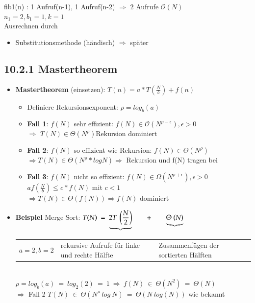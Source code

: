 \documentclass[11pt, fleqn]{scrreprt}
\begin{document}
fib1(n) : 1 Aufruf(n-1), 1 Aufruf(n-2) $\Rightarrow$ 2 Aufrufe $\mathcal{O}(N)$ \\
\hspace*{5cm} $n_1 = 2, b_1 = 1, k = 1$ \\
Ausrechnen durch 
\begin{itemize}
	\item Substitutionsmethode (\glqq händisch\grqq) $\Rightarrow$ später
\end{itemize}
	\subsection*{10.2.1 Mastertheorem}
	\begin{itemize}
	\item \textbf{Mastertheorem} (einsetzen): $T(n) = a* T\left(\frac{N}{b}\right) + f(n)$
	\begin{itemize}[label={}]
		\item Definiere Rekursionsexponent: $\rho = log_b(a)$
		\item \textbf{Fall 1}: $f(N)$ sehr effizient: $f(N) \in \mathcal{O}(N^{\rho-\epsilon}), \epsilon > 0$ \\ 
		$\Rightarrow$ $T(N) \in \Theta(N^\rho)$Rekursion dominiert
		\item \textbf{Fall 2}: $f(N)$ so effizient wie Rekursion: $f(N) \in \Theta(N^\rho)$ \\
		$\Rightarrow T(N) \in \Theta(N^\rho * logN) \Rightarrow$ Rekursion und f(N) tragen bei
		\item \textbf{Fall 3}: $f(N)$ nicht so effizient: $f(N) \in \Omega(N^{\rho + \epsilon}), \epsilon > 0$ \\
		\hspace*{5cm} $a f\left(\frac{N}{b}\right) \leq c* f(N)$ mit $c < 1$ \\
		$\Rightarrow T(N) \in \Theta(f(N)) \Rightarrow f(N)$ dominiert
	\end{itemize}
	\item \textbf{Beispiel} Merge Sort: $T(N)\ =\ \underbrace{2 T \ \left(\frac{N}{2}\right)}\hspace*{0.7cm} +\hspace*{0.7cm} \underbrace{\Theta\ (N)}$\\
	\begin{tabular}{L{4cm} L{3cm} L{3cm}}
		$a=2, b=2$ & rekursive Aufrufe für linke und rechte Hälfte & Zusammenfügen der sortierten Hälften\\
	\end{tabular}\\
	\hspace*{1cm} $\rho = log_b(a) \ = \ log_2(2) \ = \ 1 \ \Rightarrow \ f(N)\ \in \ \Theta(N^2) \ = \ \Theta(N)$\\
	$\Rightarrow$ Fall 2  \hspace*{1cm} $T(N)\  \in\  \Theta(N^{\rho}\ log\ N)\ =\ \boxed{\Theta(N\ log(N))}$ wie bekannt
\end{itemize}
\end{document}
